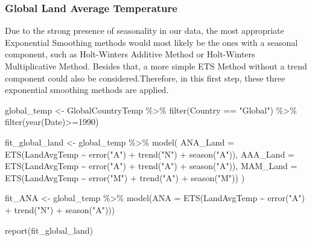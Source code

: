 \documentclass[
]{article}
\newenvironment{Shaded}{\begin{snugshade}}{\end{snugshade}}
\newcommand{\AttributeTok}[1]{\textcolor[rgb]{0.77,0.63,0.00}{#1}}
\newcommand{\DecValTok}[1]{\textcolor[rgb]{0.00,0.00,0.81}{#1}}
\newcommand{\FunctionTok}[1]{\textcolor[rgb]{0.00,0.00,0.00}{#1}}
\newcommand{\NormalTok}[1]{#1}
\newcommand{\OtherTok}[1]{\textcolor[rgb]{0.56,0.35,0.01}{#1}}
\newcommand{\SpecialCharTok}[1]{\textcolor[rgb]{0.00,0.00,0.00}{#1}}
\newcommand{\StringTok}[1]{\textcolor[rgb]{0.31,0.60,0.02}{#1}}
\begin{document}
\hypertarget{global-land-average-temperature}{%
\subsubsection{Global Land Average
Temperature}\label{global-land-average-temperature}}

Due to the strong presence of seasonality in our data, the most
appropriate Exponential Smoothing methods would most likely be the ones
with a seasonal component, such as Holt-Winters Additive Method or
Holt-Winters Multiplicative Method. Besides that, a more simple ETS
Method without a trend component could also be considered.Therefore, in
this first step, these three exponential smoothing methods are applied.

\begin{Shaded}
\begin{Highlighting}[]
\NormalTok{global\_temp }\OtherTok{\textless{}{-}} 
\NormalTok{  GlobalCountryTemp }\SpecialCharTok{\%\textgreater{}\%} 
  \FunctionTok{filter}\NormalTok{(Country }\SpecialCharTok{==} \StringTok{"Global"}\NormalTok{) }\SpecialCharTok{\%\textgreater{}\%} 
  \FunctionTok{filter}\NormalTok{(}\FunctionTok{year}\NormalTok{(Date)}\SpecialCharTok{\textgreater{}=}\DecValTok{1990}\NormalTok{)}

\NormalTok{fit\_global\_land }\OtherTok{\textless{}{-}}\NormalTok{ global\_temp }\SpecialCharTok{\%\textgreater{}\%} 
  \FunctionTok{model}\NormalTok{(}
    \AttributeTok{ANA\_Land =} \FunctionTok{ETS}\NormalTok{(LandAvgTemp }\SpecialCharTok{\textasciitilde{}} \FunctionTok{error}\NormalTok{(}\StringTok{"A"}\NormalTok{) }\SpecialCharTok{+} \FunctionTok{trend}\NormalTok{(}\StringTok{"N"}\NormalTok{) }\SpecialCharTok{+} \FunctionTok{season}\NormalTok{(}\StringTok{"A"}\NormalTok{)),}
    \AttributeTok{AAA\_Land =} \FunctionTok{ETS}\NormalTok{(LandAvgTemp }\SpecialCharTok{\textasciitilde{}} \FunctionTok{error}\NormalTok{(}\StringTok{"A"}\NormalTok{) }\SpecialCharTok{+} \FunctionTok{trend}\NormalTok{(}\StringTok{"A"}\NormalTok{) }\SpecialCharTok{+} \FunctionTok{season}\NormalTok{(}\StringTok{"A"}\NormalTok{)),}
    \AttributeTok{MAM\_Land =} \FunctionTok{ETS}\NormalTok{(LandAvgTemp }\SpecialCharTok{\textasciitilde{}} \FunctionTok{error}\NormalTok{(}\StringTok{"M"}\NormalTok{) }\SpecialCharTok{+} \FunctionTok{trend}\NormalTok{(}\StringTok{"A"}\NormalTok{) }\SpecialCharTok{+} \FunctionTok{season}\NormalTok{(}\StringTok{"M"}\NormalTok{))}
\NormalTok{    )}

\NormalTok{fit\_ANA }\OtherTok{\textless{}{-}}\NormalTok{ global\_temp }\SpecialCharTok{\%\textgreater{}\%} \FunctionTok{model}\NormalTok{(}\AttributeTok{ANA =} \FunctionTok{ETS}\NormalTok{(LandAvgTemp }\SpecialCharTok{\textasciitilde{}} \FunctionTok{error}\NormalTok{(}\StringTok{"A"}\NormalTok{) }\SpecialCharTok{+} \FunctionTok{trend}\NormalTok{(}\StringTok{"N"}\NormalTok{) }\SpecialCharTok{+} \FunctionTok{season}\NormalTok{(}\StringTok{"A"}\NormalTok{)))}

\FunctionTok{report}\NormalTok{(fit\_global\_land)}
\end{Highlighting}
\end{Shaded}
\end{document}
